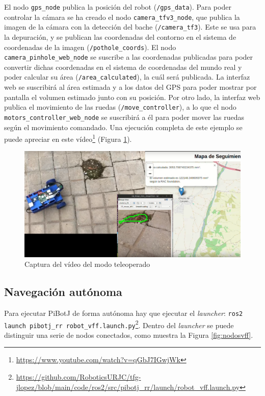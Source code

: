 El nodo \verb|gps_node| publica la posición del robot (\verb|/gps_data|). Para poder controlar la cámara se ha creado el nodo \verb|camera_tfv3_node|, que publica la imagen de la cámara con la detección del bache (\verb|/camera_tf3|). Este se usa para la depuración, y se publican las coordenadas del contorno en el sistema de coordenadas de la imagen (\verb|/pothole_coords|). El nodo \verb|camera_pinhole_web_node| se suscribe a las coordenadas publicadas para poder convertir dichas coordenadas en el sistema de coordenadas del mundo real y poder calcular su área (\verb|/area_calculated|), la cuál será publicada. La interfaz web se suscribirá al área estimada y a los datos del \acs{GPS} para poder mostrar por pantalla el volumen estimado junto con su posición. Por otro lado, la interfaz web publica el movimiento de las ruedas (\verb|/move_controller|), a lo que el nodo \verb|motors_controller_web_node| se suscribirá a él para poder mover las ruedas según el movimiento comandado. Una ejecución completa de este ejemplo se puede apreciar en este vídeo\footnote{\url{https://www.youtube.com/watch?v=qGbJ7IGwjWk}} (Figura \ref{fig:expteleop}).

\begin{figure} [h!]
	\begin{center}
		\includegraphics[width=15cm]{figs/cap7/teleop_final.png}
	\end{center}
	\caption{Captura del vídeo del modo teleoperado}
	\label{fig:expteleop}
\end{figure}


\subsection{Navegación autónoma}

Para ejecutar PiBotJ de forma autónoma hay que ejecutar el \textit{launcher}: \verb|ros2 launch pibotj_rr robot_vff.launch.py|\footnote{\url{https://github.com/RoboticsURJC/tfg-jlopez/blob/main/code/ros2/src/pibotj_rr/launch/robot_vff.launch.py}}. Dentro del \textit{launcher} se puede distinguir una serie de nodos conectados, como muestra la Figura \ref{fig:nodosvff}. 


